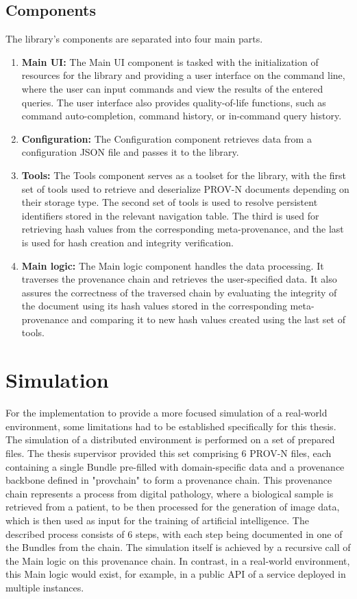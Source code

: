 \documentclass[
  digital,     %
  oneside,     %
  nosansbold,  %
  nocolorbold, %
  lof,         %
  lot,         %
]{fithesis4}
\begin{document}
\subsection{Components}
\shorthandoff{-}
The library's components are separated into four main parts.
\begin{enumerate}
    \item \textbf{Main UI:}
        The Main UI component is tasked with the initialization of resources for the library and providing a user interface on the command line, where the user can input commands and view the results of the entered queries. The user interface also provides quality-of-life functions, such as command auto-completion, command history, or in-command query history.
    \item \textbf{Configuration:}
        The Configuration component retrieves data from a configuration JSON file and passes it to the library.
    \item \textbf{Tools:}
        The Tools component serves as a toolset for the library, with the first set of tools used to retrieve and deserialize PROV-N documents depending on their storage type. 
        The second set of tools is used to resolve persistent identifiers stored in the relevant navigation table.
        The third is used for retrieving hash values from the corresponding meta-provenance, and the last is used for hash creation and integrity verification.
    \item \textbf{Main logic:}
        The Main logic component handles the data processing. It traverses the provenance chain and retrieves the user-specified data. It also assures the correctness of the traversed chain by evaluating the integrity of the document using its hash values stored in the corresponding meta-provenance and comparing it to new hash values created using the last set of tools.
\end{enumerate}
\shorthandon{-}

\section{Simulation}
\shorthandoff{-}
For the implementation to provide a more focused simulation of a real-world environment, some limitations had to be established specifically for this thesis. The simulation of a distributed environment is performed on a set of prepared files. The thesis supervisor provided this set comprising 6 PROV-N files, each containing a single Bundle pre-filled with domain-specific data and a provenance backbone defined in "provchain" to form a provenance chain. This provenance chain represents a process from digital pathology, where a biological sample is retrieved from a patient, to be then processed for the generation of image data, which is then used as input for the training of artificial intelligence. The described process consists of 6 steps, with each step being documented in one of the Bundles from the chain. The simulation itself is achieved by a recursive call of the Main logic on this provenance chain. In contrast, in a real-world environment, this Main logic would exist, for example, in a public API of a service deployed in multiple instances. 
\end{document}
